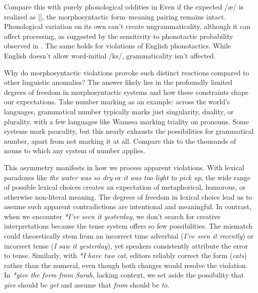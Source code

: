 Compare this with purely phonological oddities in 
\ea
{}
\z
\z
Even if the expected /æ/ is realized as [\textipa{\textsci}], the morphosyntactic form--meaning pairing remains intact. Phonological variation on its own can't create ungrammaticality, although it can affect processing, as suggested by the sensitivity to phonotactic probability observed in \textcite{Regev2024}. The same holds for violations of English phonotactics. While English doesn't allow word-initial /ks/, grammaticality isn't affected.

\bigskip
Why do morphosyntactic violations provoke such distinct reactions compared to other linguistic anomalies? The answer likely lies in the profoundly limited degrees of freedom in morphosyntactic systems and how these constraints shape our expectations. Take number marking as an example: across the world's languages, grammatical number typically marks just singularity, duality, or plurality, with a few languages like Wamesa marking triality on pronouns. Some systems mark paucality, but this nearly exhausts the possibilities for grammatical number, apart from not marking it at all. Compare this to the thousands of nouns to which any system of number applies. 

This asymmetry manifests in how we process apparent violations. With lexical paradoxes like \textit{the water was so dry} or \textit{it was too light to pick up}, the wide range of possible lexical choices creates an expectation of metaphorical, humorous, or otherwise non-literal meaning. The degrees of freedom in lexical choice lead us to assume such apparent contradictions are intentional and meaningful. In contrast, when we encounter \textit{*I've seen it yesterday}, we don't search for creative interpretations because the tense system offers so few possibilities. The mismatch could theoretically stem from an incorrect time adverbial (\textit{I've seen it recently}) or incorrect tense (\textit{I saw it yesterday}), yet speakers consistently attribute the error to tense. Similarly, with \textit{*I have two cat}, editors reliably correct the form (\textit{cats}) rather than the numeral, even though both changes would resolve the violation. In \textit{*give the form from Sarah}, lacking context, we set aside the possibility that \textit{give} should be \textit{get} and assume that \textit{from} should be \textit{to}.

